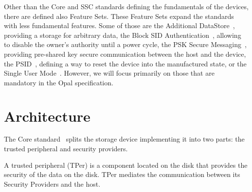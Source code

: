 Other than the Core and SSC standards defining the fundamentals of the devices, there are defined also Feature Sets. These Feature Sets expand the standards with less fundamental features. Some of those are 
the Additional DataStore~\cite{tcg-additional-datastore}, providing a storage for arbitrary data,
the Block SID Authentication~\cite{tcg-block-sid-auth}, allowing to disable the owner's authority until a power cycle,
the PSK Secure Messaging~\cite{tcg-psk-secure-messaging}, providing pre-shared key secure communication between the host and the device,
the PSID~\cite{tcg-psid}, defining a way to reset the device into the manufactured state,
or the Single User Mode~\cite{tcg-sum}.
However, we will focus primarily on those that are mandatory in the Opal specification.

\section{Architecture}



    

The Core standard~\cite{tcg-storage-core} splits the storage device implementing it into two parts: the trusted peripheral and security providers.


A trusted peripheral (TPer) is a component located on the disk that provides the security of the data on the disk. 
TPer mediates the communication between its Security Providers and the host.

